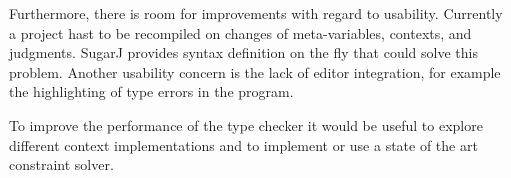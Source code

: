 Furthermore, there is room for improvements with regard to
usability. Currently a project hast to be recompiled on changes of
meta-variables, contexts, and judgments. SugarJ\cite{erdweg2011sugarj}
provides syntax definition on the fly that could solve this
problem. Another usability concern is the lack of editor integration,
for example the highlighting of type errors in the program.

To improve the performance of the type checker it would be useful to
explore different context implementations and to implement or use a
state of the art constraint solver.

